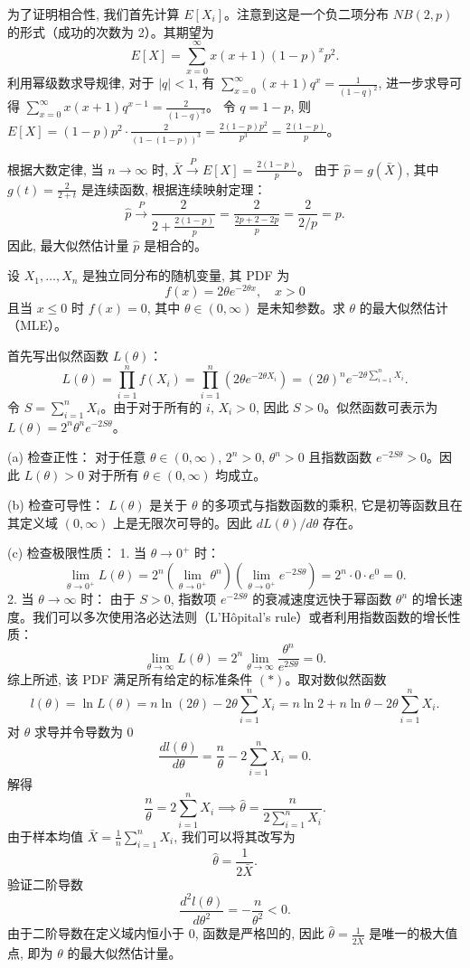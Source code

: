 \begin{questions}
\begin{solution}
为了证明相合性, 我们首先计算 $E[X_i]$。注意到这是一个负二项分布 $NB(2, p)$ 的形式（成功的次数为 2）。其期望为
\[
E[X] = \sum_{x=0}^{\infty} x(x + 1)(1 - p)^x p^2.
\]
利用幂级数求导规律, 对于 $|q| < 1$, 有 $\sum_{x=0}^{\infty} (x + 1)q^x = \frac{1}{(1 - q)^2}$, 进一步求导可得 $\sum_{x=0}^{\infty} x(x + 1)q^{x-1} = \frac{2}{(1 - q)^3}$。
令 $q = 1 - p$, 则 $E[X] = (1 - p) p^2 \cdot \frac{2}{(1 - (1 - p))^3} = \frac{2(1 - p)p^2}{p^3} = \frac{2(1 - p)}{p}$。

根据大数定律, 当 $n \to \infty$ 时, $\bar{X} \xrightarrow{P} E[X] = \frac{2(1 - p)}{p}$。
由于 $\hat{p} = g(\bar{X})$, 其中 $g(t) = \frac{2}{2 + t}$ 是连续函数, 根据连续映射定理：
\[
\hat{p} \xrightarrow{P} \frac{2}{2 + \frac{2(1 - p)}{p}} = \frac{2}{\frac{2p + 2 - 2p}{p}} = \frac{2}{2/p} = p.
\]
因此, 最大似然估计量 $\hat{p}$ 是相合的。
\end{solution}

\question
设 $X_1, \dots, X_n$ 是独立同分布的随机变量, 其 PDF 为
\[
f(x) = 2\theta e^{-2\theta x}, \quad x > 0
\]
且当 $x \le 0$ 时 $f(x) = 0$, 其中 $\theta \in (0, \infty)$ 是未知参数。求 $\theta$ 的最大似然估计（MLE）。
\begin{solution}
首先写出似然函数 $L(\theta)$：
\[
L(\theta) = \prod_{i=1}^n f(X_i) = \prod_{i=1}^n (2\theta e^{-2\theta X_i}) = (2\theta)^n e^{-2\theta \sum_{i=1}^n X_i}.
\]
令 $S = \sum_{i=1}^n X_i$。由于对于所有的 $i$, $X_i > 0$, 因此 $S > 0$。似然函数可表示为 $L(\theta) = 2^n \theta^n e^{-2S\theta}$。

(a) 检查正性：
对于任意 $\theta \in (0, \infty)$, $2^n > 0$, $\theta^n > 0$ 且指数函数 $e^{-2S\theta} > 0$。因此 $L(\theta) > 0$ 对于所有 $\theta \in (0, \infty)$ 均成立。

(b) 检查可导性：
$L(\theta)$ 是关于 $\theta$ 的多项式与指数函数的乘积, 它是初等函数且在其定义域 $(0, \infty)$ 上是无限次可导的。因此 $d L(\theta) / d\theta$ 存在。

(c) 检查极限性质：
1. 当 $\theta \to 0^+$ 时：
\[
\lim_{\theta \to 0^+} L(\theta) = 2^n \left( \lim_{\theta \to 0^+} \theta^n \right) \left( \lim_{\theta \to 0^+} e^{-2S\theta} \right) = 2^n \cdot 0 \cdot e^0 = 0.
\]
2. 当 $\theta \to \infty$ 时：
由于 $S > 0$, 指数项 $e^{-2S\theta}$ 的衰减速度远快于幂函数 $\theta^n$ 的增长速度。我们可以多次使用洛必达法则（L'Hôpital's rule）或者利用指数函数的增长性质：
\[
\lim_{\theta \to \infty} L(\theta) = 2^n \lim_{\theta \to \infty} \frac{\theta^n}{e^{2S\theta}} = 0.
\]
综上所述, 该 PDF 满足所有给定的标准条件 $(*)$。取对数似然函数
\[
l(\theta) = \ln L(\theta) = n \ln(2\theta) - 2\theta \sum_{i=1}^n X_i = n \ln 2 + n \ln \theta - 2\theta \sum_{i=1}^n X_i.
\]
对 $\theta$ 求导并令导数为 0
\[
\frac{d l(\theta)}{d \theta} = \frac{n}{\theta} - 2 \sum_{i=1}^n X_i = 0.
\]
解得
\[
\frac{n}{\theta} = 2 \sum_{i=1}^n X_i \implies \hat{\theta} = \frac{n}{2 \sum_{i=1}^n X_i}.
\]
由于样本均值 $\bar{X} = \frac{1}{n} \sum_{i=1}^n X_i$, 我们可以将其改写为
\[
\hat{\theta} = \frac{1}{2\bar{X}}.
\]
验证二阶导数
\[
\frac{d^2 l(\theta)}{d \theta^2} = -\frac{n}{\theta^2} < 0.
\]
由于二阶导数在定义域内恒小于 0, 函数是严格凹的, 因此 $\hat{\theta} = \frac{1}{2\bar{X}}$ 是唯一的极大值点, 即为 $\theta$ 的最大似然估计量。
\end{solution}


\end{questions}
